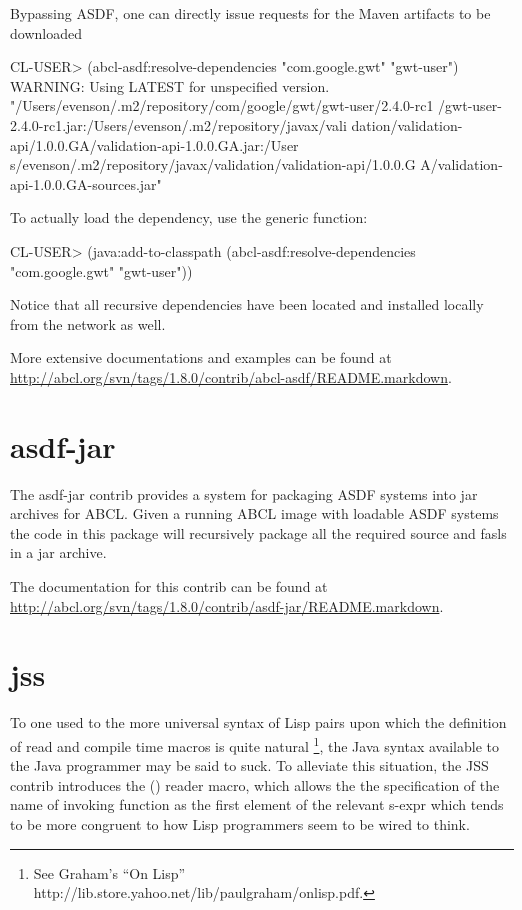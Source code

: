 \documentclass[10pt]{book}
\begin{document}
Bypassing \textsc{ASDF}, one can directly issue requests for the Maven
artifacts to be downloaded

\begin{listing-lisp}
CL-USER> (abcl-asdf:resolve-dependencies "com.google.gwt"
                                         "gwt-user")
WARNING: Using LATEST for unspecified version.
"/Users/evenson/.m2/repository/com/google/gwt/gwt-user/2.4.0-rc1
/gwt-user-2.4.0-rc1.jar:/Users/evenson/.m2/repository/javax/vali
dation/validation-api/1.0.0.GA/validation-api-1.0.0.GA.jar:/User
s/evenson/.m2/repository/javax/validation/validation-api/1.0.0.G
A/validation-api-1.0.0.GA-sources.jar"
\end{listing-lisp}

To actually load the dependency, use the  generic
function:

\begin{listing-lisp}
CL-USER> (java:add-to-classpath
          (abcl-asdf:resolve-dependencies "com.google.gwt"
                                          "gwt-user"))
\end{listing-lisp}

Notice that all recursive dependencies have been located and installed
locally from the network as well.

More extensive documentations and examples can be found at
\url{http://abcl.org/svn/tags/1.8.0/contrib/abcl-asdf/README.markdown}.

\section{asdf-jar}
\label{sec:asdf-jar}

The asdf-jar contrib provides a system for packaging \textsc{ASDF}
systems into jar archives for \textsc{ABCL}.  Given a running
\textsc{ABCL} image with loadable \textsc{ASDF} systems the code in
this package will recursively package all the required source and
fasls in a jar archive.

The documentation for this contrib can be found at
\url{http://abcl.org/svn/tags/1.8.0/contrib/asdf-jar/README.markdown}.

\section{jss}
\label{section:jss}

To one used to the more universal syntax of Lisp pairs upon which the
definition of read and compile time macros is quite
natural \footnote{See Graham's ``On Lisp''
  http://lib.store.yahoo.net/lib/paulgraham/onlisp.pdf.}, the Java
syntax available to the Java programmer may be said to suck.  To
alleviate this situation, the JSS contrib introduces the
 () reader macro, which allows
the the specification of the name of invoking function as the first
element of the relevant s-expr which tends to be more congruent to how
Lisp programmers seem to be wired to think.
\end{document}
